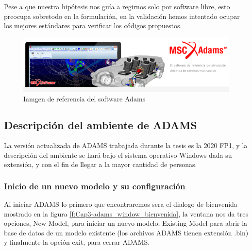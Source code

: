     Pese a que nuestra hipótesis nos guía a regirnos solo por software libre, esto preocupa sobretodo en la formulación, en la validación hemos intentado ocupar los mejores estándares para verificar los códigos propuestos.
    
    
    \begin{figure}[htb]
        \centering
        \includegraphics[width=1\linewidth]{Main/Chapter3/Images3/adams/logo_adams.png}
        \caption{Iamgen de referencia del software Adams}
        \label{f:Cap3-adams_logo}
    \end{figure} 
    
    
    \subsection{Descripción del ambiente de ADAMS}
    
    La versión actualizada de ADAMS trabajada durante la tesis es la 2020 FP1, y la descripción del ambiente se hará bajo el sistema operativo Windows dada su extensión, y con el fin de llegar a la mayor cantidad de personas.
    
        \subsubsection{Inicio de un nuevo modelo y su configuración}
        
            Al iniciar ADAMS lo primero que encontraremos sera el dialogo de bienvenida mostrado en la figura \eqref{f:Cap3-adams_window_bienvenida}, la ventana nos da tres opciones, New Model, para iniciar un nuevo modelo; Existing Model para abrir la base de datos de un modelo existente (los archivos ADAMS tienen extensión .bin) y finalmente la opción exit, para cerrar ADAMS. 
            
